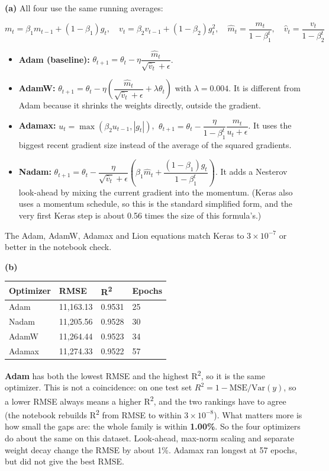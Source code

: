 \documentclass[12pt,a4paper]{article}
\providecommand{\tightlist}{\setlength{\itemsep}{0pt}\setlength{\parskip}{0pt}}
\begin{document}
\begin{answerbox}
\textbf{(a)} All four use the same running averages:

\[m_t=\beta_1 m_{t-1}+(1-\beta_1)g_t,\quad v_t=\beta_2 v_{t-1}+(1-\beta_2)g_t^2,\quad \hat m_t=\frac{m_t}{1-\beta_1^t},\quad \hat v_t=\frac{v_t}{1-\beta_2^t}\]

\begin{itemize}
\tightlist
\item
  \textbf{Adam (baseline):} \(\theta_{t+1}=\theta_t-\eta\dfrac{\hat m_t}{\sqrt{\hat v_t}+\epsilon}\).
\item
  \textbf{AdamW:} \(\theta_{t+1}=\theta_t-\eta\left(\dfrac{\hat m_t}{\sqrt{\hat v_t}+\epsilon}+\lambda\theta_t\right)\) with \(\lambda=0.004\). It is different from Adam because it shrinks the weights directly, outside the gradient.
\item
  \textbf{Adamax:} \(u_t=\max(\beta_2u_{t-1},|g_t|)\), \(\ \theta_{t+1}=\theta_t-\dfrac{\eta}{1-\beta_1^t}\dfrac{m_t}{u_t+\epsilon}\). It uses the biggest recent gradient size instead of the average of the squared gradients.
\item
  \textbf{Nadam:} \(\theta_{t+1}=\theta_t-\dfrac{\eta}{\sqrt{\hat v_t}+\epsilon}\left(\beta_1\hat m_t+\dfrac{(1-\beta_1)g_t}{1-\beta_1^t}\right)\). It adds a Nesterov look-ahead by mixing the current gradient into the momentum. (Keras also uses a momentum schedule, so this is the standard simplified form, and the very first Keras step is about 0.56 times the size of this formula's.)
\end{itemize}

The Adam, AdamW, Adamax and Lion equations match Keras to \(3\times10^{-7}\) or better in the notebook check.

\textbf{(b)}

\begin{center}\small
\begin{tabular}{@{}llll@{}}
\toprule
Optimizer & RMSE & R\textsuperscript{2} & Epochs \\
\midrule
Adam & 11,163.13 & 0.9531 & 25 \\
Nadam & 11,205.56 & 0.9528 & 30 \\
AdamW & 11,264.44 & 0.9523 & 34 \\
Adamax & 11,274.33 & 0.9522 & 57 \\
\bottomrule
\end{tabular}
\end{center}

\textbf{Adam} has both the lowest RMSE and the highest R\textsuperscript{2}, so it is the same optimizer. This is not a coincidence: on one test set \(R^2 = 1-\text{MSE}/\text{Var}(y)\), so a lower RMSE always means a higher R\textsuperscript{2}, and the two rankings have to agree (the notebook rebuilds R\textsuperscript{2} from RMSE to within \(3\times10^{-8}\)). What matters more is how small the gaps are: the whole family is within \textbf{1.00\%}. So the four optimizers do about the same on this dataset. Look-ahead, max-norm scaling and separate weight decay change the RMSE by about 1\%. Adamax ran longest at 57 epochs, but did not give the best RMSE.


\end{answerbox}
\end{document}
